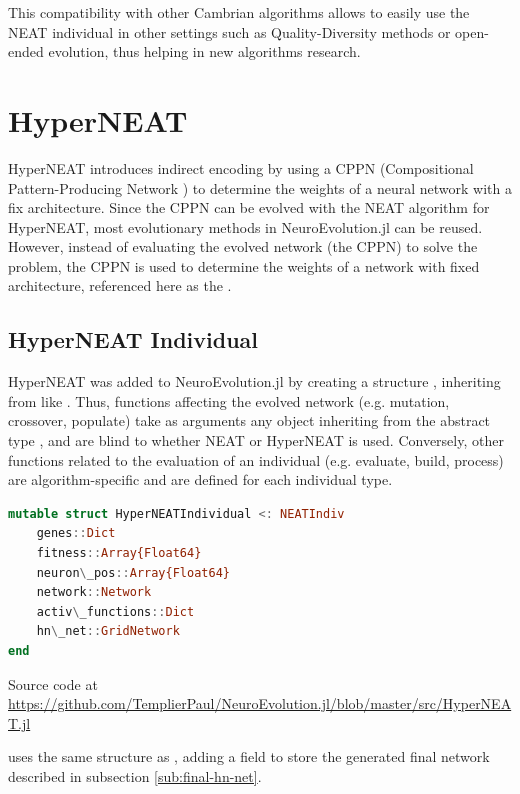 This compatibility with other Cambrian algorithms allows to easily use the NEAT individual in other settings such as Quality-Diversity methods or open-ended evolution, thus helping in new algorithms research.

\section{HyperNEAT}
HyperNEAT \cite{HyperNEAT} introduces indirect encoding by using a CPPN (Compositional Pattern-Producing Network \cite{CPPN}) to determine the weights of a neural network with a fix architecture. Since the CPPN can be evolved with the NEAT algorithm for HyperNEAT, most evolutionary methods in NeuroEvolution.jl can be reused. \\ 
However, instead of evaluating the evolved network (the CPPN) to solve the problem, the CPPN is used to determine the weights of a network with fixed architecture, referenced here as the . 

\subsection{HyperNEAT Individual}

HyperNEAT was added to NeuroEvolution.jl by creating a structure , inheriting from  like . Thus, functions affecting the evolved network (e.g. mutation, crossover, populate) take as arguments any object inheriting from the abstract type , and are blind to whether NEAT or HyperNEAT is used. Conversely, other functions related to the evaluation of an individual (e.g. evaluate, build, process) are algorithm-specific and are defined for each individual type.

\begin{minipage}{\linewidth}
\begin{lstlisting}[language=Julia, caption=HyperNEAT Individual]
mutable struct HyperNEATIndividual <: NEATIndiv
    genes::Dict
    fitness::Array{Float64}
    neuron\_pos::Array{Float64}
    network::Network
    activ\_functions::Dict
    hn\_net::GridNetwork
end
\end{lstlisting}
Source code at \url{https://github.com/TemplierPaul/NeuroEvolution.jl/blob/master/src/HyperNEAT.jl}\\
\end{minipage}

 uses the same structure as , adding a  field to store the generated final network described in subsection \ref{sub:final-hn-net}.

